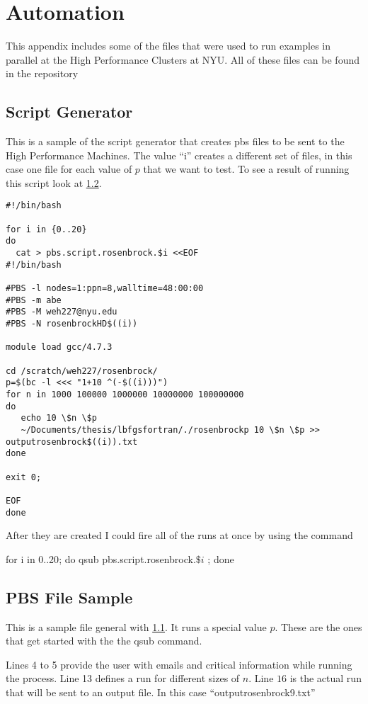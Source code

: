 \chapter{Automation}

This appendix includes some of the files that were used to run examples in parallel at the High Performance Clusters at NYU.  All of these files can be found in the repository \citep{lbfgsbNS}

\section{Script Generator} \label{pbsgenerator}

This is a sample of the script generator that creates pbs files to be sent to the High Performance Machines. The value ``i'' creates a different set of files, in this case one file for each value of $p$ that we want to test. To see a result of running this script look at \ref{pbsfile}. 
\lstset{
  language=sh,
  firstnumber = 1
}

\begin{lstlisting}
#!/bin/bash

for i in {0..20}
do
  cat > pbs.script.rosenbrock.$i <<EOF
#!/bin/bash

#PBS -l nodes=1:ppn=8,walltime=48:00:00
#PBS -m abe
#PBS -M weh227@nyu.edu
#PBS -N rosenbrockHD$((i))

module load gcc/4.7.3

cd /scratch/weh227/rosenbrock/
p=$(bc -l <<< "1+10 ^(-$((i)))")
for n in 1000 100000 1000000 10000000 100000000
do
   echo 10 \$n \$p
   ~/Documents/thesis/lbfgsfortran/./rosenbrockp 10 \$n \$p >> outputrosenbrock$((i)).txt
done

exit 0;

EOF
done

\end{lstlisting}
After they are created I could fire all of the runs at once by using the command 

\label{qsubfire}
for i in {0..20}; do qsub pbs.script.rosenbrock.$\$i$ ; done


\section{PBS File Sample} \label{pbsfile}
This is a sample file general with \ref{pbsgenerator}. It runs a special value $p$.  These are the ones that get started with the the qsub command.

Lines 4 to 5 provide the user with emails and critical information while running the process. Line 13 defines a run for different sizes of $n$. Line $16$ is the actual run that will be sent to an output file. In this case ``outputrosenbrock9.txt''
\lstset{
  language=sh,
  firstnumber = 1
}

